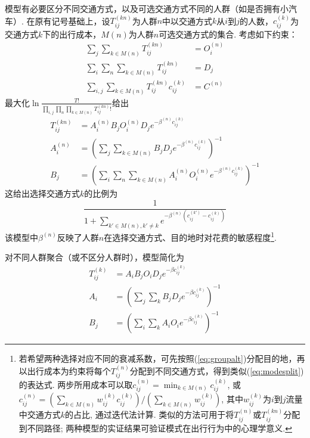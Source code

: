 \par 模型有必要区分不同交通方式，以及可选交通方式不同的人群（如是否拥有小汽车）. 在原有记号基础上，设$T_{ij}^{(kn)}$为人群$n$中以交通方式$k$从$i$到$j$的人数，$c_{ij}^{(k)}$为交通方式$k$下的出行成本，$M(n)$为人群$n$可选交通方式的集合. 考虑如下约束：
\begin{align}
    \sum_j \sum_{k\in M(n)}T_{ij}^{(kn)}&=O_i^{(n)}\\
    \sum_i \sum_n \sum_{k\in M(n)} T_{ij}^{(kn)}&=D_j\\
    \sum_{i,j} \sum_{k\in M(n)} T_{ij}^{(kn)}c_{ij}^{(k)}&=C^{(n)}
\end{align}
最大化$\ln \frac{T!}{\prod_{i,j}\prod_n \prod_{k\in M(n)}T_{ij}^{(kn)}!}$给出
\begin{align}
    T_{ij}^{(kn)}&=A_i^{(n)}B_jO_i^{(n)}D_j e^{-\beta^{(n)} c_{ij}^{(k)}}\\
    A_i^{(n)} &= \left(\sum_j\sum_{k\in M(n)}  B_jD_j e^{-\beta^{(n)} c_{ij}^{(k)}}\right)^{-1}\\
    B_j &= \left(\sum_i \sum_n \sum_{k\in M(n)}A_i^{(n)}O_i^{(n)} e^{-\beta^{(n)} c_{ij}^{(k)}}\right)^{-1}
\end{align}
这给出选择交通方式$k$的比例为
\begin{equation}
    \frac{1}{1+\sum_{k'\in M(n), k'\neq k}e^{-\beta^{(n)} (c_{ij}^{(k')}-c_{ij}^{(k)})}}
    \label{eq:modesplit}
\end{equation}
该模型中$\beta^{(n)}$反映了人群$n$在选择交通方式、目的地时对花费的敏感程度\footnote{若希望两种选择对应不同的衰减系数，可先按照(\ref{eq:groupalt})分配目的地，再以出行成本为约束将每个$T_{ij}^{(n)}$分配到不同交通方式，得到类似(\ref{eq:modesplit})的表达式. 两步所用成本可以取$c_{ij}^{(n)}=\min_{k\in M(n)} c_{ij}^{(k)}$, 或$c_{ij}^{(n)}=(\sum_{k\in M(n)} w_{ij}^{(k)} c_{ij}^{(k)})/(\sum_{k\in M(n)} w_{ij}^{(k)})$, 其中$w_{ij}^{(k)}$为$i$到$j$流量中交通方式$k$的占比, 通过迭代法计算. 类似的方法可用于将$T_{ij}^{(n)}$或$T_{ij}^{(kn)}$分配到不同路径; 两种模型的实证结果可验证模式在出行行为中的心理学意义. }. 
\par 对不同人群聚合（或不区分人群时），模型简化为
\begin{align}
    T_{ij}^{(k)}&=A_iB_jO_iD_j e^{-\beta c_{ij}^{(k)}}\\
    A_i &= \left(\sum_j\sum_k  B_jD_j e^{-\beta c_{ij}^{(k)}}\right)^{-1}\\
    B_j &= \left(\sum_i \sum_k A_iO_i e^{-\beta c_{ij}^{(k)}}\right)^{-1}
\end{align}

